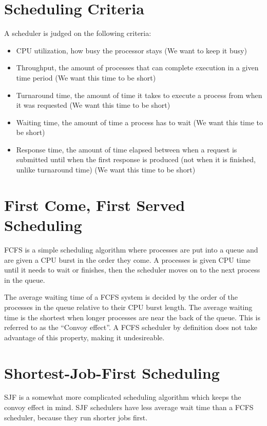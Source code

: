 \documentclass{article}
\begin{document}
\section{Scheduling Criteria}
A scheduler is judged on the following criteria:

\begin{itemize}
	\item CPU utilization, how busy the processor stays (We want to keep it
		busy)
	\item Throughput, the amount of processes that can complete execution in a
		given time period (We want this time to be short)
	\item Turnaround time, the amount of time it takes to execute a process
		from when it was requested (We want this time to be short)
	\item Waiting time, the amount of time a process has to wait (We want this
		time to be short)
	\item Response time, the amount of time elapsed between when a request is
		submitted until when the first response is produced (not when it is
		finished, unlike turnaround time) (We want this time to be short)
\end{itemize}

\section{First Come, First Served Scheduling}
FCFS is a simple scheduling algorithm where processes are put into a queue and
are given a CPU burst in the order they come. A processes is given CPU time
until it needs to wait or finishes, then the scheduler moves on to the next
process in the queue.

The average waiting time of a FCFS system is decided by the order of the
processes in the queue relative to their CPU burst length. The average waiting
time is the shortest when longer processes are near the back of the queue. This
is referred to as the ``Convoy effect''. A FCFS scheduler by definition does
not take advantage of this property, making it undesireable.

\section{Shortest-Job-First Scheduling}
SJF is a somewhat more complicated scheduling algorithm which keeps the convoy
effect in mind. SJF schedulers have less average wait time than a FCFS
scheduler, because they run shorter jobs first.
\end{document}
